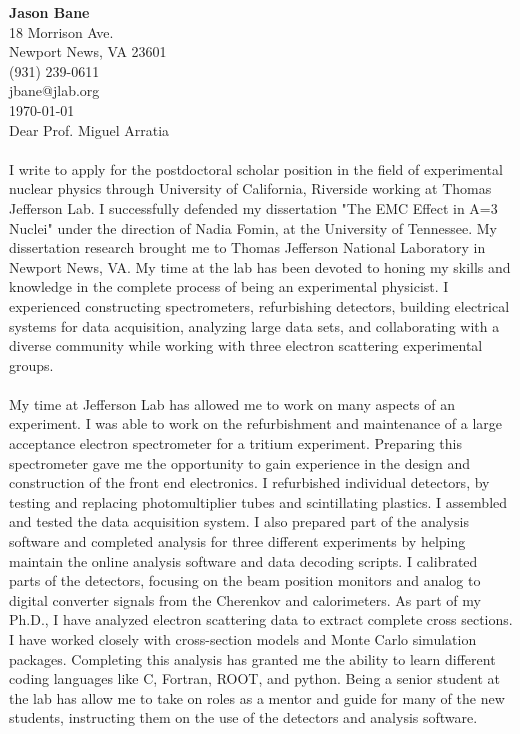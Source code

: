 \documentclass[12pt,letterpaper]{article}
\newcommand{\CPP}
{C\nolinebreak[4]\hspace{-.05em}\raisebox{.22ex}{\footnotesize\bf ++}}
\begin{document}
\vspace*{-1.2cm}
\noindent\textbf{Jason Bane}\\
18 Morrison Ave. \\
Newport News, VA 23601 \\
(931) 239-0611 \\
jbane@jlab.org \\
\today\\

Dear Prof. Miguel Arratia
 

\paragraph{}I write to apply for the postdoctoral scholar position in the field of experimental nuclear physics through University of California, Riverside working at Thomas Jefferson Lab. I successfully defended my dissertation "The EMC Effect in A=3 Nuclei" under the direction of Nadia Fomin, at the University of Tennessee. My dissertation research brought me to Thomas Jefferson National Laboratory in Newport News, VA. My time at the lab has been devoted to honing my skills and knowledge in the complete process of being an experimental physicist. I experienced constructing spectrometers, refurbishing detectors, building electrical systems for data acquisition, analyzing large data sets, and collaborating with a diverse community while working with three electron scattering experimental groups.
\paragraph{}My time at Jefferson Lab has allowed me to work on many aspects of an experiment. I was able to work on the refurbishment and maintenance of a large acceptance electron spectrometer for a tritium experiment. Preparing this spectrometer gave me the opportunity to gain experience in the design and construction of the front end electronics. I refurbished individual detectors, by testing and replacing photomultiplier tubes and scintillating plastics. I assembled and tested the data acquisition system.
I also prepared part of the analysis software and completed analysis for three different experiments by helping maintain the online analysis software and data decoding scripts. I calibrated parts of the detectors, focusing on the beam position monitors and analog to digital converter signals from the Cherenkov and calorimeters. As part of my Ph.D., I have analyzed electron scattering data to extract complete cross sections. I have worked closely with cross-section models and Monte Carlo simulation packages. Completing this analysis has granted me the ability to learn different coding languages like \CPP, Fortran, ROOT, and python. Being a senior student at the lab has allow me to take on roles as a mentor and guide for many of the new students, instructing them on the use of the detectors and analysis software.
\end{document}
